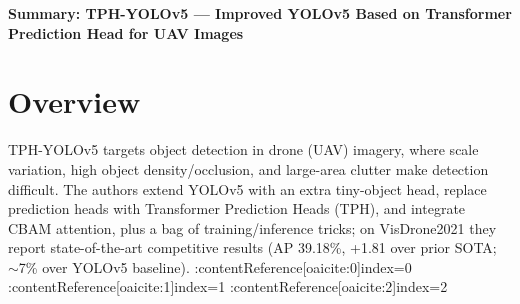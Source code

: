 \documentclass[11pt]{article}
\begin{document}
\begin{center}
{\LARGE \textbf{Summary: TPH-YOLOv5 — Improved YOLOv5 Based on Transformer Prediction Head for UAV Images}}\\[4pt]
\end{center}

\section*{Overview}
TPH-YOLOv5 targets object detection in drone (UAV) imagery, where scale variation, high object density/occlusion, and large-area clutter make detection difficult. The authors extend YOLOv5 with an extra tiny-object head, replace prediction heads with Transformer Prediction Heads (TPH), and integrate CBAM attention, plus a bag of training/inference tricks; on VisDrone2021 they report state-of-the-art competitive results (AP 39.18\%, +1.81 over prior SOTA; $\sim$7\% over YOLOv5 baseline). :contentReference[oaicite:0]{index=0} :contentReference[oaicite:1]{index=1} :contentReference[oaicite:2]{index=2}
\end{document}
